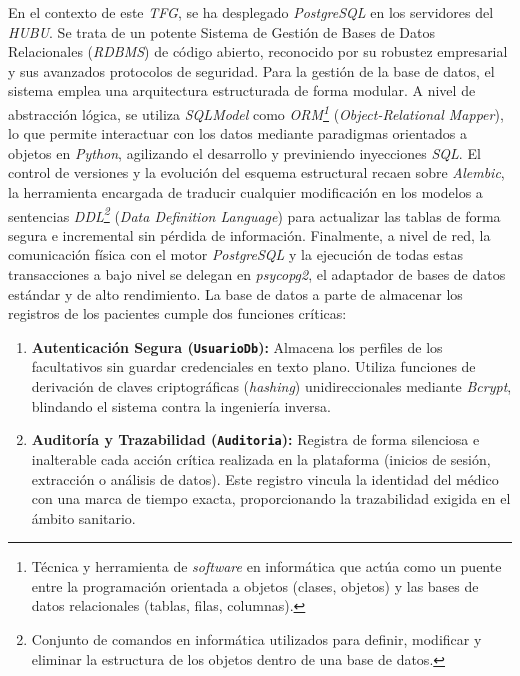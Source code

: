 En el contexto de este \textit{TFG}, se ha desplegado \textit{PostgreSQL} en los servidores del \textit{HUBU}. Se trata de un potente Sistema de Gestión de Bases de Datos Relacionales (\textit{RDBMS}) de código abierto, reconocido por su robustez empresarial y sus avanzados protocolos de seguridad. Para la gestión de la base de datos, el sistema emplea una arquitectura estructurada de forma modular. A nivel de abstracción lógica, se utiliza \textit{SQLModel} como \textit{ORM\footnote{Técnica y herramienta de \textit{software} en informática que actúa como un puente entre la programación orientada a objetos (clases, objetos) y las bases de datos relacionales (tablas, filas, columnas).}} (\textit{Object-Relational Mapper}), lo que permite interactuar con los datos mediante paradigmas orientados a objetos en \textit{Python}, agilizando el desarrollo y previniendo inyecciones \textit{SQL}. El control de versiones y la evolución del esquema estructural recaen sobre \textit{Alembic}, la herramienta encargada de traducir cualquier modificación en los modelos a sentencias \textit{DDL\footnote{Conjunto de comandos en informática utilizados para definir, modificar y eliminar la estructura de los objetos dentro de una base de datos.}} (\textit{Data Definition Language}) para actualizar las tablas de forma segura e incremental sin pérdida de información. Finalmente, a nivel de red, la comunicación física con el motor \textit{PostgreSQL} y la ejecución de todas estas transacciones a bajo nivel se delegan en \textit{psycopg2}, el adaptador de bases de datos estándar y de alto rendimiento. La base de datos a parte de almacenar los registros de los pacientes cumple dos funciones críticas:

\begin{enumerate}
    \item \textbf{Autenticación Segura (\texttt{UsuarioDb}):} Almacena los perfiles de los facultativos sin guardar credenciales en texto plano. Utiliza funciones de derivación de claves criptográficas (\textit{hashing}) unidireccionales mediante \textit{Bcrypt}, blindando el sistema contra la ingeniería inversa.
    \item \textbf{Auditoría y Trazabilidad (\texttt{Auditoria}):} Registra de forma silenciosa e inalterable cada acción crítica realizada en la plataforma (inicios de sesión, extracción o análisis de datos). Este registro vincula la identidad del médico con una marca de tiempo exacta, proporcionando la trazabilidad exigida en el ámbito sanitario.
\end{enumerate}

